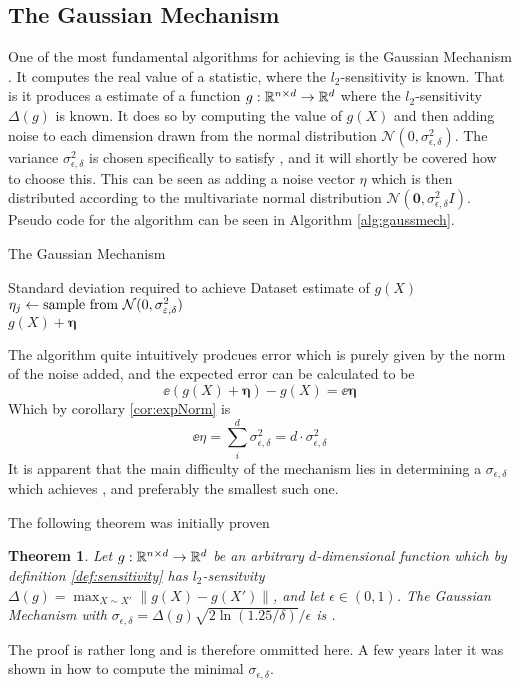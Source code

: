 \documentclass[a4paper,12pt]{article}
\newcommand{\Desc}[2]{\State \makebox[6em][l]{#1}#2}
\newtheorem{theorem}{Theorem}
\begin{document}
\subsection{The Gaussian Mechanism}
One of the most fundamental algorithms for achieving 
\edp is the Gaussian Mechanism \cite{dpbasic}. It computes the real
value of a statistic, where the $l_2$-sensitivity is known.
That is it produces a \edp estimate of a function 
$g: \R^{n \times d} \rightarrow \R^{d}$ where the $l_2$-sensitivity $ \Delta(g) $ 
is known.
It does so by computing the value of $g(X)$ and then adding noise
to each dimension drawn from the normal distribution 
$\mathcal{N}(0, \sigma_{\epsilon,\delta}^2)$.
The variance $\sigma_{\epsilon, \delta}^2$ is chosen specifically to satisfy \edp, 
and it will shortly be covered how to choose this.
This can be seen as adding a noise vector $\eta$ which 
is then distributed according to
the multivariate normal distribution 
$\mathcal{N}(\bm{0}, \sigma_{\epsilon,\delta}^2I)$. 
Pseudo code for the algorithm can be seen in Algorithm \ref{alg:gaussmech}.

\begin{algorithm}
\caption{The Gaussian Mechanism}\label{alg:gaussmech}
\begin{algorithmic}
    \Input
    \Desc{$\sigma_{\epsilon,\delta}$}{Standard deviation required to achieve \edp}
    \Desc{$X \in \R^{n \times d}$}{Dataset}
    \EndInput
    \Output
    \State\edp estimate of $g(X)$
    \EndOutput
        \State$\eta_j \gets \textnormal{sample from } \mathcal{N}(0, \sigma_{\epsilon,\delta}^2)$
    \EndFor \\
    \Return$g(X) + \bm{\eta}$
\end{algorithmic}
\end{algorithm}
\noindent The algorithm quite intuitively prodcues error which is purely given by the norm of the noise added, and the expected error can be calculated to be
\[
    \ee{(g(X) + \bm{\eta}) - g(X)} = 
    \ee{\bm{\eta}}
\]
Which by corollary \ref{cor:expNorm} is 
\begin{equation}
\label{eq:ExpErrGM}
    \ee{\eta} = \sum_i^d \sigma_{\epsilon,\delta}^2 = d \cdot \sigma_{\epsilon,\delta}^2
\end{equation}
It is apparent that the main difficulty of the mechanism 
lies in determining a $\sigma_{\epsilon, \delta}$ which achieves
\edp, and preferably the smallest such one.

The following theorem was initially proven
\begin{theorem}\textnormal{}
\label{theo:gaussMech}
Let $g: \R^{n \times d} \rightarrow \R^{d}$ be an arbitrary 
$d$-dimensional function which by definition \ref{def:sensitivity} has $l_2$-sensitvity 
$ \Delta(g) = \max_{X \sim X'} \| g(X) - g(X') \|$, 
and let $\epsilon \in (0,1)$.
The Gaussian Mechanism with
$\sigma_{\epsilon, \delta} = \Delta(g)  \sqrt{2\ln(1.25/\delta)}/\epsilon$ 
is \edp.
\end{theorem}
The proof is rather long and is therefore ommitted here. A few years later it was shown in \cite{BalleWang} how to compute the minimal $\sigma_{\epsilon, \delta}$.
\end{document}
